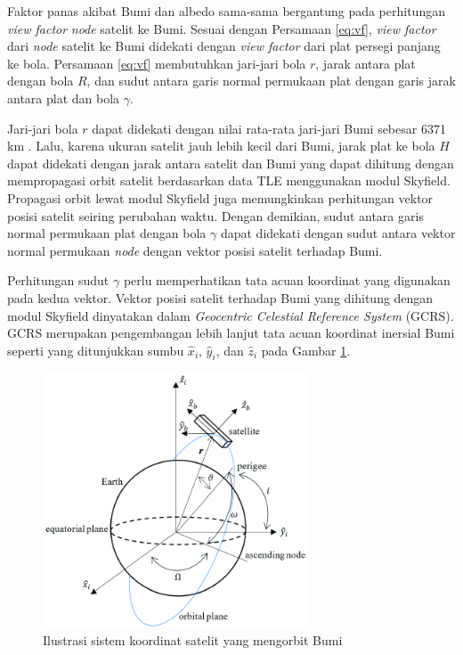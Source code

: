 Faktor panas akibat Bumi dan albedo sama-sama bergantung pada perhitungan
\textit{view factor} \textit{node} satelit ke Bumi. Sesuai dengan Persamaan
\ref{eq:vf}, \textit{view factor} dari \textit{node} satelit ke Bumi didekati
dengan \textit{view factor} dari plat persegi panjang ke bola. Persamaan
\ref{eq:vf} membutuhkan jari-jari bola $r$, jarak antara plat dengan bola $R$,
dan sudut antara garis normal permukaan plat dengan garis jarak antara plat dan
bola $\gamma$. 

Jari-jari bola $r$ dapat didekati dengan nilai rata-rata jari-jari Bumi sebesar
6371 km \cite{moritz}. Lalu, karena ukuran satelit jauh lebih kecil dari Bumi,
jarak plat ke bola $H$ dapat didekati dengan jarak antara satelit dan Bumi yang
dapat dihitung dengan mempropagasi orbit satelit berdasarkan data TLE
menggunakan modul Skyfield. Propagasi orbit lewat modul Skyfield juga
memungkinkan perhitungan vektor posisi satelit seiring perubahan waktu. Dengan
demikian, sudut antara garis normal permukaan plat dengan bola $\gamma$ dapat
didekati dengan sudut antara vektor normal permukaan \textit{node} dengan
vektor posisi satelit terhadap Bumi. 

Perhitungan sudut $\gamma$ perlu memperhatikan tata acuan koordinat yang
digunakan pada kedua vektor. Vektor posisi satelit terhadap Bumi yang dihitung
dengan modul Skyfield dinyatakan dalam \textit{Geocentric Celestial
Reference System} (GCRS). GCRS merupakan pengembangan lebih lanjut tata acuan
koordinat inersial Bumi seperti yang ditunjukkan sumbu $\hat{x}_i$,
$\hat{y}_i$, dan $\hat{z}_i$ pada Gambar \ref{fig:referenceframe}.

\begin{figure}[H]
\setlength{}
\begin{center}
\includegraphics[width=0.7\textwidth]{fig/referenceframe.png}
	\caption[Ilustrasi sistem koordinat satelit yang mengorbit Bumi]{Ilustrasi sistem koordinat satelit yang mengorbit Bumi~\cite{farissi2019}}
\label{fig:referenceframe}
\end{center}
\end{figure}

